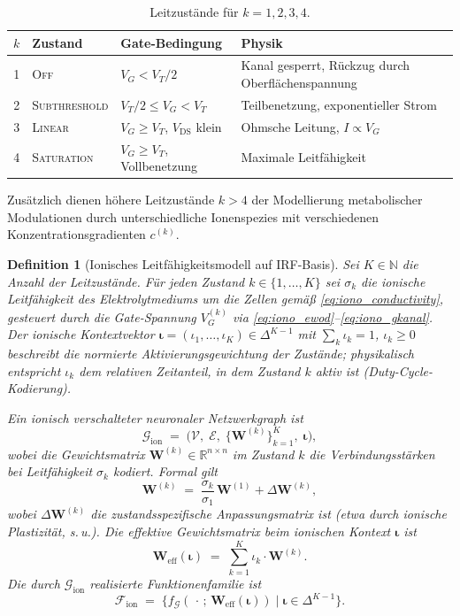 ﻿\documentclass[12pt, a4paper, openany]{report}
\newtheorem{definition}[theorem]{Definition}
\newcommand{\R}{\mathbb{R}}
\newcommand{\N}{\mathbb{N}}
\newcommand{\calG}{\mathcal{G}}
\newcommand{\calV}{\mathcal{V}}
\newcommand{\calE}{\mathcal{E}}
\newcommand{\calF}{\mathcal{F}}
\begin{document}
\begin{table}
	\centering
	\begin{tabular}{clll}
		\toprule
		$k$ & Zustand & Gate-Bedingung & Physik \\
		\midrule
		1 & \textsc{Off} & $V_G < V_T/2$ & Kanal gesperrt, Rückzug durch Oberflächenspannung \\
		2 & \textsc{Subthreshold} & $V_T/2 \leq V_G < V_T$ & Teilbenetzung, exponentieller Strom \\
		3 & \textsc{Linear} & $V_G \geq V_T$, $V_\mathrm{DS}$ klein & Ohmsche Leitung, $I \propto V_G$ \\
		4 & \textsc{Saturation} & $V_G \geq V_T$, Vollbenetzung & Maximale Leitfähigkeit \\
		\bottomrule
	\end{tabular}
	\label{tab:Leitzustaende}
	\caption{Leitzustände für $k = 1, 2, 3, 4$.}
\end{table}

\noindent Zusätzlich dienen höhere Leitzustände $k > 4$ der Modellierung
metabolischer Modulationen durch unterschiedliche Ionenspezies mit
versch\-iedenen Konzentrationsgradienten $c^{(k)}$.

\begin{definition}[Ionisches Leitfähigkeitsmodell auf IRF-Basis]
\label{def:ionic_conductance}
Sei $K \in \N$ die Anzahl der Leitzustände.  Für jeden Zustand $k \in
\{1,\ldots,K\}$ sei $\sigma_k$ die ionische Leitfähigkeit des
Elektrolytmediums um die Zellen gemäß \eqref{eq:iono_conductivity},
gesteuert durch die Gate-Span\-nung $V_G^{(k)}$ via
\eqref{eq:iono_ewod}--\eqref{eq:iono_gkanal}.  Der
\emph{ionische Kontextvektor}
$\bm{\iota} = (\iota_1, \ldots, \iota_K) \in \Delta^{K-1}$
mit $\sum_k \iota_k = 1$, $\iota_k \geq 0$
beschreibt die normierte Aktivierungsgewichtung der Zustände; physikalisch
entspricht $\iota_k$ dem relativen Zeitanteil, in dem Zustand $k$ aktiv ist
(Duty-Cycle-Kodierung).

Ein \emph{ionisch verschalteter neuronaler Netzwerkgraph} ist
\[
  \calG_{\mathrm{ion}}
  \;=\;
  \bigl(\calV,\; \calE,\; \{\bm{W}^{(k)}\}_{k=1}^K,\; \bm{\iota}\bigr),
\]
wobei die Gewichtsmatrix $\bm{W}^{(k)} \in \R^{n \times n}$ im Zustand $k$
die Verbindungsstärken bei Leitfähigkeit $\sigma_k$ kodiert.
Formal gilt
\begin{equation}
  \label{eq:ionic_weight_scaling}
  \bm{W}^{(k)} \;=\; \frac{\sigma_k}{\sigma_1}\,\bm{W}^{(1)} +\Delta\bm{W}^{(k)},
\end{equation}
wobei $\Delta\bm{W}^{(k)}$ die zustandsspezifische Anpassungsmatrix ist
(etwa durch ionische Plastizität, s.\,u.).  Die \emph{effektive Gewichtsmatrix}
beim ionischen Kontext $\bm{\iota}$ ist
\begin{equation}
  \label{eq:ionic_weight}
  \bm{W}_{\mathrm{eff}}(\bm{\iota})
  \;=\;
  \sum_{k=1}^{K} \iota_k \cdot \bm{W}^{(k)}.
\end{equation}
Die durch $\calG_{\mathrm{ion}}$ realisierte Funktionenfamilie ist
\[
  \calF_{\mathrm{ion}}
  \;=\;
  \bigl\{f_{\calG}(\,\cdot\,;\, \bm{W}_{\mathrm{eff}}(\bm{\iota})) \;\big|\;
         \bm{\iota} \in \Delta^{K-1}\bigr\}.
\]
\end{definition}
\end{document}
